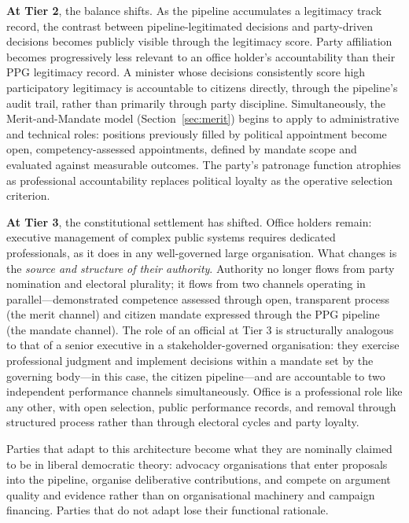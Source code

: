\documentclass[12pt,a4paper,oneside]{report}
\begin{document}
\textbf{At Tier 2}, the balance shifts. As the pipeline accumulates a legitimacy track record, the contrast between pipeline-legitimated decisions and party-driven decisions becomes publicly visible through the legitimacy score. Party affiliation becomes progressively less relevant to an office holder's accountability than their PPG legitimacy record. A minister whose decisions consistently score high participatory legitimacy is accountable to citizens directly, through the pipeline's audit trail, rather than primarily through party discipline. Simultaneously, the Merit-and-Mandate model (Section~\ref{sec:merit}) begins to apply to administrative and technical roles: positions previously filled by political appointment become open, competency-assessed appointments, defined by mandate scope and evaluated against measurable outcomes. The party's patronage function atrophies as professional accountability replaces political loyalty as the operative selection criterion.

\textbf{At Tier 3}, the constitutional settlement has shifted. Office holders remain: executive management of complex public systems requires dedicated professionals, as it does in any well-governed large organisation. What changes is the \emph{source and structure of their authority}. Authority no longer flows from party nomination and electoral plurality; it flows from two channels operating in parallel---demonstrated competence assessed through open, transparent process (the merit channel) and citizen mandate expressed through the PPG pipeline (the mandate channel). The role of an official at Tier 3 is structurally analogous to that of a senior executive in a stakeholder-governed organisation: they exercise professional judgment and implement decisions within a mandate set by the governing body---in this case, the citizen pipeline---and are accountable to two independent performance channels simultaneously. Office is a professional role like any other, with open selection, public performance records, and removal through structured process rather than through electoral cycles and party loyalty.

Parties that adapt to this architecture become what they are nominally claimed to be in liberal democratic theory: advocacy organisations that enter proposals into the pipeline, organise deliberative contributions, and compete on argument quality and evidence rather than on organisational machinery and campaign financing. Parties that do not adapt lose their functional rationale.
\end{document}
